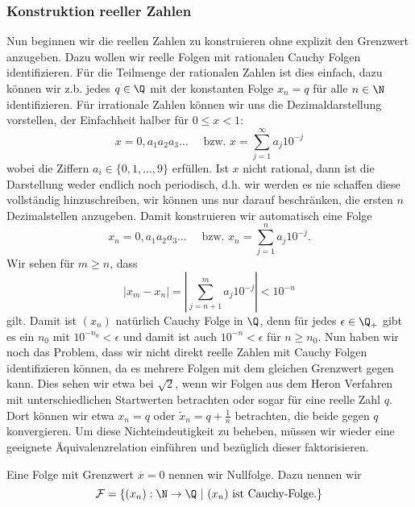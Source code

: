 \documentclass[letterpaper,10pt,english]{jupyterBook}
\begin{document}
\subsubsection{Konstruktion reeller Zahlen}
\label{\detokenize{grundlagen/zahlensysteme:konstruktion-reeller-zahlen}}
Nun beginnen wir die reellen Zahlen zu konstruieren ohne explizit den Grenzwert anzugeben. Dazu wollen wir reelle Folgen mit rationalen Cauchy Folgen identifizieren. Für die Teilmenge der rationalen Zahlen ist dies einfach, dazu können wir z.b. jedes \(q \in \Q\) mit der konstanten Folge \(x_n = q\) für alle \(n \in \N\) identifizieren. Für irrationale Zahlen können wir uns die Dezimaldarstellung vorstellen, der Einfachheit halber für \(0\leq x <1\):
\begin{equation*}
x = 0,a_1a_2a_3 \ldots  \quad \text{ bzw. } x=\sum_{j=1}^\infty a_j 10^{-j}
\end{equation*}
wobei die Ziffern \(a_i \in \{0,1,\ldots,9\}\) erfüllen. Ist \(x\) nicht rational, dann ist die Darstellung weder endlich noch periodisch, d.h. wir werden es nie schaffen diese vollständig hinzuschreiben, wir können uns nur darauf beschränken, die ersten \(n\) Dezimalstellen anzugeben. Damit konstruieren wir automatisch eine Folge
\begin{equation*}
x_n = 0,a_1a_2a_3 \ldots  \quad \text{ bzw. } x_n=\sum_{j=1}^n a_j 10^{-j} .
\end{equation*}
Wir sehen für \(m \geq n\), dass
\begin{equation*}
|x_m -x_n| = | \sum_{j=n+1}^m a_j 10^{-j}| < 10^{-n}
\end{equation*}
gilt. Damit ist \((x_n)\) natürlich Cauchy Folge in \(\Q\), denn für jedes \(\epsilon \in \Q_+\) gibt es ein \(n_0\) mit
\(10^{-n_0} < \epsilon \) und damit ist auch \(10^{-n} < \epsilon\) für \(n \geq n_0\).
Nun haben wir noch das Problem, dass wir nicht direkt reelle Zahlen mit Cauchy Folgen identifizieren können, da es mehrere Folgen mit dem gleichen Grenzwert gegen kann. Dies sehen wir etwa bei \(\sqrt{2}\), wenn wir Folgen aus dem Heron Verfahren mit unterschiedlichen Startwerten betrachten oder sogar für eine reelle Zahl \(q\). Dort können wir etwa \(x_n=q\) oder \(\tilde x_n = q +\frac{1}n\) betrachten, die beide gegen \(q\) konvergieren. Um diese Nichteindeutigkeit zu beheben, müssen wir wieder eine geeignete Äquivalenzrelation einführen und bezüglich dieser faktorisieren.
\label{grundlagen/zahlensysteme:definition-17}
\begin{definition}{}{}



Eine Folge mit Grenzwert \(\overline{x}=0\) nennen wir Nullfolge. Dazu nennen wir
\begin{equation*}
 {\cal F} = \{ (x_n): \N \rightarrow \Q~|~(x_n) \text{ ist Cauchy-Folge.}\}
\end{equation*}\end{definition}
\end{document}
